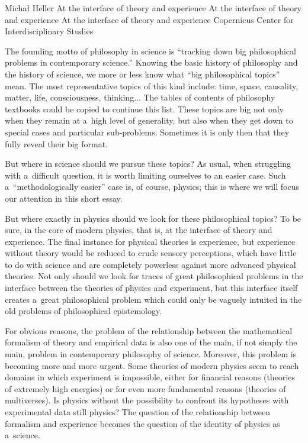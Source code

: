 \begin{editorialeng}{Michał Heller}
	{At the interface of theory and experience}
	{At the interface of theory and experience}
	{At the interface of theory and experience}
	{Copernicus Center for Interdisciplinary Studies}



\lettrine[loversize=0.13,lines=2,lraise=-0.03,nindent=0em,findent=0.2pt]%
{T}{}he founding motto of philosophy in science is ``tracking down big philosophical problems in contemporary science.'' Knowing the basic history of philosophy and the history of science, we more or less know what ``big philosophical topics'' mean. The most representative topics of this kind include: time, space, causality, matter, life, consciousness, thinking... The tables of contents of philosophy textbooks could be copied to continue this list. These topics are big not only when they remain at a~high level of generality, but also when they get down to special cases and particular sub-problems. Sometimes it is only then that they fully reveal their big format.

But where in science should we pursue these topics? As usual, when struggling with a~difficult question, it is worth limiting ourselves to an easier case. Such a~``methodologically easier'' case is, of course, physics; this is where we will focus our attention in this short essay.

But where exactly in physics should we look for these philosophical topics? To be sure, in the core of modern physics, that is, at the interface of theory and experience. The final instance for physical theories is experience, but experience without theory would be reduced to crude sensory perceptions, which have little to do with science and are completely powerless against more advanced physical theories. Not only should we look for traces of great philosophical problems in the interface between the theories of physics and experiment, but this interface itself creates a~great philosophical problem which could only be vaguely intuited in the old problems of philosophical epistemology.

For obvious reasons, the problem of the relationship between the mathematical formalism of theory and empirical data is also one of the main, if not simply the main, problem in contemporary philosophy of science. Moreover, this problem is becoming more and more urgent. Some theories of modern physics seem to reach domains in which experiment is impossible, either for financial reasons (theories of extremely high energies) or for even more fundamental reasons (theories of multiverses). Is physics without the possibility to confront its hypotheses with experimental data still physics? The question of the relationship between formalism and experience becomes the question of the identity of physics as a~science.


\end{editorialeng}
